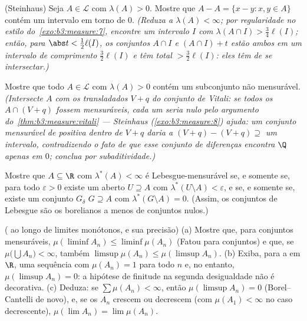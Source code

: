 \begin{exercise}[$\star\star\star$]\label{exo:b3:measure:8}
(Steinhaus) Seja $A \in \mathcal L$ com $\lambda(A) > 0$. Mostre que $A - A = \{x - y : x, y \in A\}$ contém um intervalo
em torno de $0$. \emph{(Reduza a $\lambda(A) < \infty$; por regularidade no estilo
do~\cref{exo:b3:measure:7}, encontre um intervalo $I$ com $\lambda(A \cap I) > \frac34\ell(I)$; então, para
$\abs t <
\frac12\ell(I)$, os conjuntos $A\cap I$ e $(A\cap I) + t$ estão ambos em um intervalo de
comprimento $\frac32\ell(I)$ e têm  total $> \frac32\ell(I)$: eles têm de se
intersectar.)}
\end{exercise}

\begin{exercise}[$\star\star\star$]\label{exo:b3:measure:9}
Mostre que todo $A \in \mathcal L$ com $\lambda(A) > 0$ contém um subconjunto não mensurável.
\emph{(Intersecte $A$ com os transladados $V + q$ do conjunto de
Vitali: se todos os $A \cap (V+q)$ fossem mensuráveis, cada um seria nulo pelo
argumento do~\cref{thm:b3:measure:vitali} --- Steinhaus (\cref{exo:b3:measure:8}) ajuda: um
conjunto mensurável de  positiva dentro de $V + q$ daria a
$(V+q) - (V+q) \supseteq$ um intervalo, contradizendo o fato de que esse conjunto de
diferenças encontra $\Q$ apenas em $0$; conclua por
subaditividade.)}
\end{exercise}

\begin{exercise}[$\star\star$]\label{exo:b3:measure:10}
Mostre que $A \subseteq \R$ com $\lambda^*(A) < \infty$ é Lebesgue-mensurável se, e somente se, para
todo $\varepsilon > 0$ existe um aberto $U \supseteq A$ com $\lambda^*(U \setminus A) <
\varepsilon$, e se, e somente se, existe
um conjunto $G_\delta$ $G \supseteq A$ com $\lambda^*(G\setminus A) = 0$. (Assim, os conjuntos de Lebesgue são
os borelianos a menos de conjuntos nulos.)
\end{exercise}

\begin{exercise}[$\star\star$]\label{exo:b3:measure:11}
( ao longo de limites monótonos, e sua precisão)
(a) Mostre que, para conjuntos mensuráveis, $\mu(\liminf A_n) \leq
\liminf\mu(A_n)$ (Fatou para
conjuntos) e que, se $\mu\bigl(\bigcup A_n\bigr) < \infty$, também $\limsup\mu(A_n) \leq \mu(\limsup A_n)$.
(b) Exiba, para a  em $\R$, uma sequência com
$\mu(A_n) = 1$ para todo $n$ e, no entanto, $\mu(\limsup A_n) = 0$: a hipótese de finitude na
segunda desigualdade não é decorativa.
(c) Deduza: se $\sum\mu(A_n) < \infty$, então $\mu(\limsup A_n) = 0$ (Borel--Cantelli de novo), e, se os
$A_n$ crescem ou decrescem (com $\mu(A_1) < \infty$ no caso decrescente), $\mu(\lim A_n) = \lim\mu(A_n)$.
\end{exercise}

